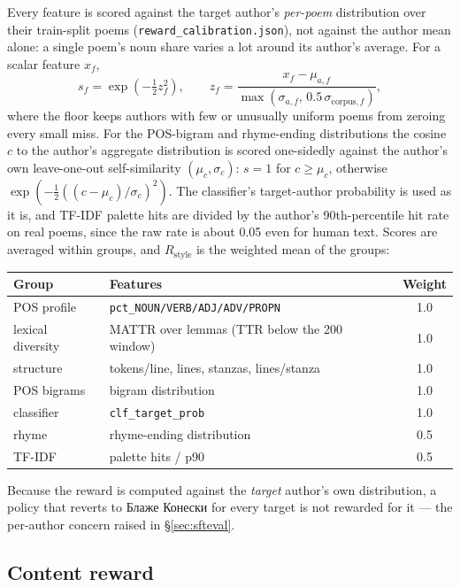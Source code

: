 \documentclass[11pt]{article}
\begin{document}
Every feature is scored against the target author's \emph{per-poem}
distribution over their train-split poems (\texttt{reward\_calibration.json}),
not against the author mean alone: a single poem's noun share varies a lot
around its author's average. For a scalar feature $x_f$,
\begin{equation}
  s_f = \exp\!\left(-\tfrac12 z_f^2\right),\qquad
  z_f = \frac{x_f-\mu_{a,f}}{\max(\sigma_{a,f},\,0.5\,\sigma_{\mathrm{corpus},f})},
\end{equation}
where the floor keeps authors with few or unusually uniform poems from
zeroing every small miss. For the POS-bigram and rhyme-ending distributions
the cosine $c$ to the author's aggregate distribution is scored one-sidedly
against the author's own leave-one-out self-similarity $(\mu_c,\sigma_c)$:
$s=1$ for $c\ge\mu_c$, otherwise $\exp(-\tfrac12((c-\mu_c)/\sigma_c)^2)$.
The classifier's target-author probability is used as it is, and TF-IDF
palette hits are divided by the author's 90th-percentile hit rate on real
poems, since the raw rate is about 0.05 even for human text. Scores are
averaged within groups, and $R_{\mathrm{style}}$ is the weighted mean of the
groups:

\begin{center}
\begin{tabular}{llc}
\toprule
Group & Features & Weight \\
\midrule
POS profile & \texttt{pct\_NOUN/VERB/ADJ/ADV/PROPN} & 1.0 \\
lexical diversity & MATTR over lemmas (TTR below the 200 window) & 1.0 \\
structure & tokens/line, lines, stanzas, lines/stanza & 1.0 \\
POS bigrams & bigram distribution & 1.0 \\
classifier & \texttt{clf\_target\_prob} & 1.0 \\
rhyme & rhyme-ending distribution & 0.5 \\
TF-IDF & palette hits / p90 & 0.5 \\
\bottomrule
\end{tabular}
\end{center}

Because the reward is computed against the \emph{target} author's own
distribution, a policy that reverts to Блаже Конески for every target is not
rewarded for it --- the per-author concern raised in
\S\ref{sec:sfteval}.

\subsection{Content reward}
\end{document}
